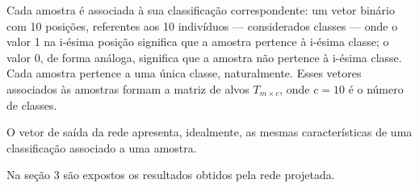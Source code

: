 Cada amostra é associada à sua classificação correspondente: um vetor binário
com 10 posições, referentes aos 10 indivíduos --- considerados classes --- onde
o valor 1 na i-ésima posição significa que a amostra pertence à i-ésima classe;
o valor 0, de forma análoga, significa que a amostra não pertence à i-ésima
classe. Cada amostra pertence a uma única classe, naturalmente. Esses vetores
associados às amostras formam a matriz de alvos $T_{m\times c}$, onde $c = 10$ é
o número de classes.

O vetor de saída da rede apresenta, idealmente, as mesmas características de uma
classificação associado a uma amostra.

Na seção 3 são expostos os resultados obtidos pela rede projetada.
